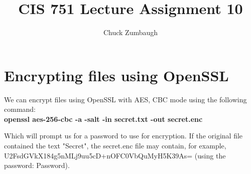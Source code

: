 \documentclass[12pt]{article}
\title{CIS 751 Lecture Assignment 10}
\author{Chuck Zumbaugh}
\begin{document}
\maketitle

\section{Encrypting files using OpenSSL}
We can encrypt files using OpenSSL with AES, CBC mode using the following command:\\
\textbf{openssl aes-256-cbc -a -salt -in secret.txt -out secret.enc}

Which will prompt us for a password to use for encryption. If the original file contained the text "Secret", the secret.enc file may contain, for example, U2FsdGVkX184g5nMLj9uu5cD+nOFC0VbQuMyH5K39As= (using the password: Password).
\end{document}
